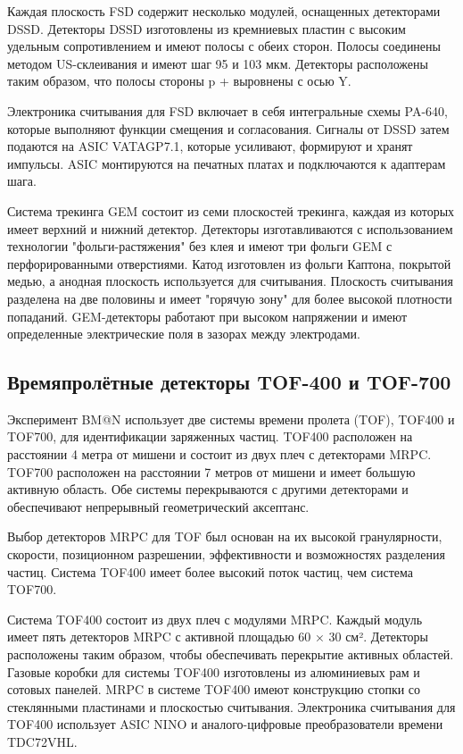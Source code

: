 Каждая плоскость FSD содержит несколько модулей, оснащенных детекторами DSSD. 
Детекторы DSSD изготовлены из кремниевых пластин с высоким удельным сопротивлением и имеют полосы с обеих сторон. 
Полосы соединены методом US-склеивания и имеют шаг 95 и 103 мкм. 
Детекторы расположены таким образом, что полосы стороны p + выровнены с осью Y.

Электроника считывания для FSD включает в себя интегральные схемы PA-640, которые выполняют функции смещения и согласования. 
Сигналы от DSSD затем подаются на ASIC VATAGP7.1, которые усиливают, формируют и хранят импульсы. 
ASIC монтируются на печатных платах и подключаются к адаптерам шага.

Система трекинга GEM состоит из семи плоскостей трекинга, каждая из которых имеет верхний и нижний детектор. 
Детекторы изготавливаются с использованием технологии "фольги-растяжения" без клея и имеют три фольги GEM с перфорированными отверстиями. 
Катод изготовлен из фольги Каптона, покрытой медью, а анодная плоскость используется для считывания. 
Плоскость считывания разделена на две половины и имеет "горячую зону" для более высокой плотности попаданий.
GEM-детекторы работают при высоком напряжении и имеют определенные электрические поля в зазорах между электродами. 

\subsection{Времяпролётные детекторы TOF-400 и TOF-700}

Эксперимент BM@N использует две системы времени пролета (TOF), TOF400 и TOF700, для идентификации заряженных частиц. 
TOF400 расположен на расстоянии 4 метра от мишени и состоит из двух плеч с детекторами MRPC. 
TOF700 расположен на расстоянии 7 метров от мишени и имеет большую активную область. 
Обе системы перекрываются с другими детекторами и обеспечивают непрерывный геометрический аксептанс.

Выбор детекторов MRPC для TOF был основан на их высокой гранулярности, скорости, позиционном разрешении, эффективности и возможностях разделения частиц. 
Система TOF400 имеет более высокий поток частиц, чем система TOF700.

Система TOF400 состоит из двух плеч с модулями MRPC. 
Каждый модуль имеет пять детекторов MRPC с активной площадью 60 × 30 см². 
Детекторы расположены таким образом, чтобы обеспечивать перекрытие активных областей. 
Газовые коробки для системы TOF400 изготовлены из алюминиевых рам и сотовых панелей. 
MRPC в системе TOF400 имеют конструкцию стопки со стеклянными пластинами и плоскостью считывания. 
Электроника считывания для TOF400 использует ASIC NINO и аналого-цифровые преобразователи времени TDC72VHL.

